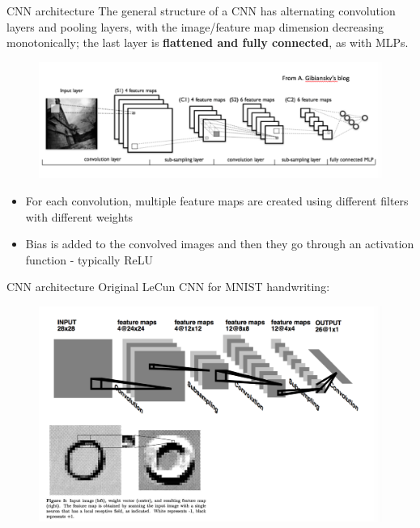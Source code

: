 \documentclass{beamer}
\begin{document}
\begin{frame}{CNN architecture}
The general structure of a CNN has alternating convolution layers
and pooling layers, with the image/feature map dimension decreasing monotonically; the last layer is \textbf{flattened
and fully connected}, as with MLPs.
\begin{figure}
\includegraphics[width=0.8\linewidth]{Images/CNNstructure.png}
\end{figure}
\begin{itemize}
\item For each convolution, multiple feature maps are created using different filters with different weights

\item Bias is added to the convolved images and then they go through an activation function - typically ReLU
\end{itemize}
\end{frame}

\begin{frame}{CNN architecture}
Original LeCun CNN for MNIST handwriting:
\begin{figure}
\includegraphics[width=0.9\linewidth]{Images/CNNorig.png}
\end{figure}
\end{frame}
\end{document}
